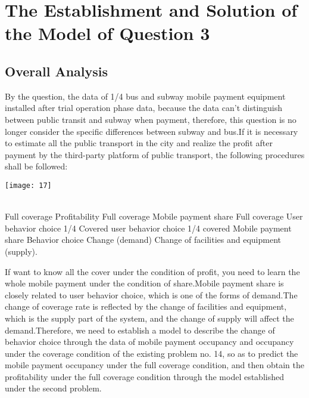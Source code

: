 \documentclass[../mcmpaper]{subfiles}
\begin{document}
\section{The Establishment and Solution of the Model of Question 3}
\subsection{Overall Analysis}
By the question, the data of 1/4 bus and subway mobile payment equipment installed after trial operation phase data, because the data can't distinguish between public transit and subway when payment, therefore, this question is no longer consider the specific differences between subway and bus.If it is necessary to estimate all the public transport in the city and realize the profit after payment by the third-party platform of public transport, the following procedures shall be followed:\\
\begin{minipage}{1.0\linewidth}
\centering
\texttt{[image: 17]}
\end{minipage}\\[1em]
Full coverage Profitability  Full coverage Mobile payment share  Full coverage User behavior choice  1/4 Covered user behavior choice  1/4 covered Mobile payment share Behavior choice Change (demand)  Change of facilities and equipment (supply).
\par
If want to know all the cover under the condition of profit, you need to learn the whole mobile payment under the condition of share.Mobile payment share is closely related to user behavior choice, which is one of the forms of demand.The change of coverage rate is reflected by the change of facilities and equipment, which is the supply part of the system, and the change of supply will affect the demand.Therefore, we need to establish a model to describe the change of behavior choice through the data of mobile payment occupancy and occupancy under the coverage condition of the existing problem no. 14, so as to predict the mobile payment occupancy under the full coverage condition, and then obtain the profitability under the full coverage condition through the model established under the second problem.
\end{document}

